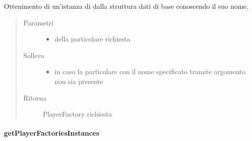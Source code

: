 \documentclass[letterpaper,10pt,italian,openany,oneside]{sphinxmanual}
\begin{document}
\begin{fulllineitems}
\label{\detokenize{source/it/unicam/cs/pa/mastermind/factories/PlayerFactoryRegistry:it.unicam.cs.pa.mastermind.factories.PlayerFactoryRegistry.getFactoryByName(String)}}
Ottenimento di un’istanza di  dalla struttura dati di base conoscendo il suo nome.
\begin{quote}\begin{description}
\item[{Parametri}] \leavevmode\begin{itemize}
\item {} 
 \textendash{} della particolare  richiesta

\end{itemize}

\item[{Solleva}] \leavevmode\begin{itemize}
\item {} 
 \textendash{} in caso la particolare  con il nome specificato tramite argomento non sia presente

\end{itemize}

\item[{Ritorna}] \leavevmode
PlayerFactory richiesta

\end{description}\end{quote}

\end{fulllineitems}



\paragraph{getPlayerFactoriesInstances}
\label{\detokenize{source/it/unicam/cs/pa/mastermind/factories/PlayerFactoryRegistry:getplayerfactoriesinstances}}
\end{document}
